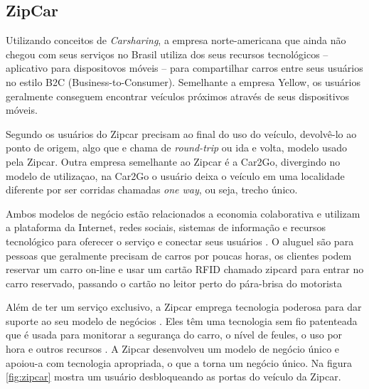 \subsection{ZipCar}

Utilizando conceitos de \textit{Carsharing}, a empresa norte-americana que ainda não chegou com seus serviços no Brasil utiliza dos seus recursos tecnológicos -- aplicativo para dispositovos móveis -- para compartilhar carros entre seus usuários no estilo B2C (Business-to-Consumer). Semelhante a empresa Yellow, os usuários geralmente conseguem encontrar veículos próximos através de seus dispositivos móveis.

Segundo \cite{ballus-armet} os usuários do Zipcar precisam ao final do uso do veículo, devolvê-lo ao ponto de origem, algo que e chama de \textit{round-trip} ou ida e volta, modelo usado pela Zipcar. Outra empresa semelhante ao Zipcar é a Car2Go, divergindo no modelo de utilizaçao, na Car2Go o usuário deixa o veículo em uma localidade diferente por ser corridas chamadas \textit{one way}, ou seja, trecho único.

Ambos modelos de negócio estão relacionados a economia colaborativa e utilizam a plataforma da Internet, redes sociais, sistemas de informação e recursos tecnológico para oferecer o serviço e conectar seus usuários \cite{ballus-armet}. O aluguel são para pessoas que geralmente precisam de carros por poucas horas, %
os clientes podem reservar um carro on-line e usar um cartão RFID chamado zipcard para entrar no carro reservado, passando o cartão no leitor perto do pára-brisa do motorista \cite{pearlson2009strategic} %

Além de ter um serviço exclusivo, a Zipcar emprega tecnologia poderosa para dar suporte ao seu modelo de negócios \cite{pearlson2009strategic}. Eles têm uma tecnologia sem fio patenteada que é usada para monitorar a segurança do carro, o nível de feules, o uso por hora e outros recursos \cite{pearlson2009strategic}. A Zipcar desenvolveu um modelo de negócio único e apoiou-a com tecnologia apropriada, o que a torna um negócio único. Na figura \ref{fig:zipcar} mostra um usuário desbloqueando as portas do veículo da Zipcar.

